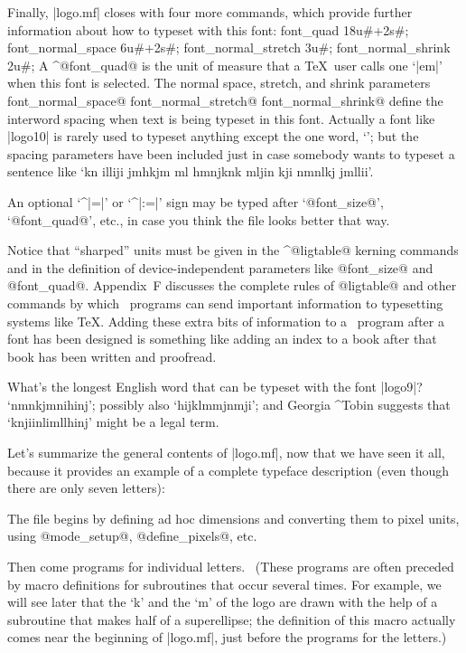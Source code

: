 {{{{\danger Finally, |logo.mf| closes with four more commands, which provide
further information about how to typeset with this font:
\begintt
font_quad  18u#+2s#;
font_normal_space  6u#+2s#;
font_normal_stretch  3u#;
font_normal_shrink  2u#;
\endtt
A ^@font\_quad@ is the unit of measure that a \TeX\ user calls one `|em|'
when this font is selected. The normal space, stretch, and shrink parameters
^^@font\_normal\_space@ ^^@font\_normal\_stretch@ ^^@font\_normal\_shrink@
define the interword spacing when text is being typeset in this font.
Actually a font like |logo10| is rarely used to typeset anything except
the one word, `\MF\kern1pt'; but the spacing parameters have been
included just in case somebody wants to typeset a sentence like
`{\manual kn illiji jmhkjm ml hmnjknk mljin kji nmnlkj jmllii}'.

\danger An optional `^|=|' or `^|:=|' sign may be typed after `@font\_size@',
`@font\_quad@', etc., in case you think the file looks better that way.

\danger Notice that ``sharped'' units must be given in the ^@ligtable@
kerning commands and in the definition of device-independent
parameters like @font\_size@
and @font\_quad@. Appendix~F discusses the complete rules of @ligtable@
and other commands by which \MF\ programs can send important information
to typesetting systems like \TeX. Adding these extra bits of information
to a \MF\ program after a font has been designed is something like
adding an index to a book after that book has been written and proofread.

\ddangerexercise What's the longest English word that can be typeset
with the font |logo9|?
\answer `{\manual nmnkjmnihinj\/}'; possibly also `{\manual hijklmmjnmji}';
and Georgia ^{Tobin} suggests that `{\manual knjiinlimllhinj\/}'
might be a legal term.

\ninepoint  %
\danger Let's summarize the general contents of |logo.mf|, now that we
have seen it all, because it provides an example of a complete typeface
description (even though there are only seven letters):\enddanger

\smallskip
\item\bull The file begins by defining ad hoc dimensions and converting
them to pixel units, using @mode\_setup@, @define\_pixels@, etc.

\smallskip
\item\bull Then come programs for individual letters. \ (These programs
are often preceded by macro definitions for subroutines that occur several
times. For example, we will see later that the `{\manual k}' and the
`{\manual m}' of the logo are drawn with the help of a subroutine that makes
half of a superellipse; the definition of this macro actually comes near
the beginning of |logo.mf|, just before the programs for the letters.)

}}}}
